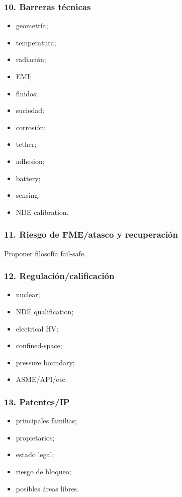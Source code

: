 \documentclass[11pt,a4paper]{article}
\begin{document}
\subsubsection*{10. Barreras técnicas}
\begin{itemize}
\item geometría;
\item temperatura;
\item radiación;
\item EMI;
\item fluidos;
\item suciedad;
\item corrosión;
\item tether;
\item adhesion;
\item battery;
\item sensing;
\item NDE calibration.
\end{itemize}


\subsubsection*{11. Riesgo de FME/atasco y recuperación}
Proponer filosofía fail-safe.


\subsubsection*{12. Regulación/calificación}
\begin{itemize}
\item nuclear;
\item NDE qualification;
\item electrical HV;
\item confined-space;
\item pressure boundary;
\item ASME/API/etc.
\end{itemize}


\subsubsection*{13. Patentes/IP}
\begin{itemize}
\item principales familias;
\item propietarios;
\item estado legal;
\item riesgo de bloqueo;
\item posibles áreas libres.
\end{itemize}
\end{document}
